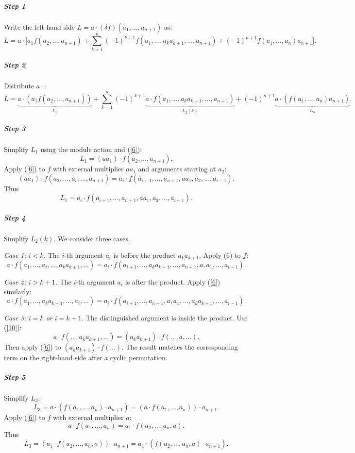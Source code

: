 \documentclass[pdflatex,sn-mathphys-num]{sn-jnl}%
\theoremstyle{thmstyleone}%
\theoremstyle{thmstyletwo}%
\theoremstyle{thmstylethree}%
\begin{document}
\subparagraph{Step 1} Write the left-hand side $L = a \cdot (\delta f)(a_1, \dots, a_{n+1})$ as:
\[
L = a \cdot \Bigg[ a_1 f(a_2, \dots, a_{n+1}) + \sum_{k=1}^{n} (-1)^{k+1} f(a_1, \dots, a_k a_{k+1}, \dots, a_{n+1}) + (-1)^{n+1} f(a_1, \dots, a_n) a_{n+1} \Bigg].
\]

\subparagraph{Step 2} Distribute $a \cdot$:
\[
L = \underbrace{a \cdot (a_1 f(a_2, \dots, a_{n+1}))}_{L_1} + \sum_{k=1}^{n} (-1)^{k+1} \underbrace{a \cdot f(a_1, \dots, a_k a_{k+1}, \dots, a_{n+1})}_{L_2(k)} + (-1)^{n+1} \underbrace{a \cdot (f(a_1, \dots, a_n) a_{n+1})}_{L_3}.
\]

\subparagraph{Step 3} Simplify $L_1$ using the module action and (\ref{6}):
\[
L_1 = (a a_1) \cdot f(a_2, \dots, a_{n+1}).
\]
Apply (\ref{6}) to $f$ with external multiplier $a a_1$ and arguments starting at $a_2$:
\[
(a a_1) \cdot f(a_2, \dots, a_i, \dots, a_{n+1}) = a_i \cdot f(a_{i+1}, \dots, a_{n+1}, a a_1, a_2, \dots, a_{i-1}).
\]
Thus
\[
L_1 = a_i \cdot f(a_{i+1}, \dots, a_{n+1}, a a_1, a_2, \dots, a_{i-1}).
\]

\subparagraph{Step 4} Simplify $L_2(k)$. We consider three cases.

\noindent\textit{Case 1: $i < k$.} The $i$-th argument $a_i$ is before the product $a_k a_{k+1}$. Apply (6) to $f$:
\[
a \cdot f(a_1, \dots, a_i, \dots, a_k a_{k+1}, \dots) = a_i \cdot f(a_{i+1}, \dots, a_k a_{k+1}, \dots, a_{n+1}, a, a_1, \dots, a_{i-1}).
\]

\noindent\textit{Case 2: $i > k+1$.} The $i$-th argument $a_i$ is after the product. Apply (\ref{6}) similarly:
\[
a \cdot f(a_1, \dots, a_k a_{k+1}, \dots, a_i, \dots) = a_i \cdot f(a_{i+1}, \dots, a_{n+1}, a, a_1, \dots, a_k a_{k+1}, \dots, a_{i-1}).
\]

\noindent\textit{Case 3: $i = k$ or $i = k+1$.} The distinguished argument is inside the product. Use (\ref{10}):
\[
a \cdot f(\dots, a_k a_{k+1}, \dots) = (a_k a_{k+1}) \cdot f(\dots, a, \dots).
\]
Then apply (\ref{6}) to $(a_k a_{k+1}) \cdot f(\dots)$. The result matches the corresponding term on the right-hand side after a cyclic permutation.

\subparagraph{Step 5} Simplify $L_3$:
\[
L_3 = a \cdot (f(a_1, \dots, a_n) \cdot a_{n+1}) = (a \cdot f(a_1, \dots, a_n)) \cdot a_{n+1}.
\]
Apply (\ref{6}) to $f$ with external multiplier $a$:
\[
a \cdot f(a_1, \dots, a_n) = a_1 \cdot f(a_2, \dots, a_n, a).
\]
Thus
\[
L_3 = (a_1 \cdot f(a_2, \dots, a_n, a)) \cdot a_{n+1} = a_1 \cdot (f(a_2, \dots, a_n, a) \cdot a_{n+1}).
\]
\end{document}
